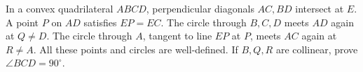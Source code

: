 In a convex quadrilateral $ABCD$, perpendicular diagonals $AC,BD$ intersect at $E$. A point $P$ on $AD$ satisfies $EP=EC$. The circle through $B,C,D$ meets $AD$ again at $Q\ne D$. The circle through $A$, tangent to line $EP$ at $P$, meets $AC$ again at $R\ne A$. All these points and circles are well-defined. If $B,Q,R$ are collinear, prove $\angle BCD=90^\circ$.
